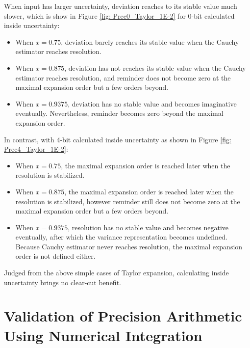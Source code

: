 \documentclass[twoside]{article}
\numberwithin{equation}{section}
\begin{document}
When input has larger uncertainty, deviation reaches to its stable value much slower, which is show in Figure \ref{fig: Prec0_Taylor_1E-2} for 0-bit calculated inside uncertainty: 
\begin{itemize} 
\item When $x=0.75$, deviation barely reaches its stable value when the Cauchy estimator reaches resolution.
\item When $x=0.875$, deviation has not reaches its stable value when the Cauchy estimator reaches resolution, and reminder does not become zero at the maximal expansion order but a few orders beyond.
\item When $x=0.9375$, deviation has no stable value and becomes imaginative eventually. Nevertheless, reminder becomes zero beyond the maximal expansion order.
\end{itemize}
In contrast, with 4-bit calculated inside uncertainty as shown in Figure \ref{fig: Prec4_Taylor_1E-2}:
\begin{itemize} 
\item When $x=0.75$, the maximal expansion order is reached later when the resolution is stabilized.
\item When $x=0.875$, the maximal expansion order is reached later when the resolution is stabilized, however reminder still does not become zero at the maximal expansion order but a few orders beyond.
\item When $x=0.9375$, resolution has no stable value and becomes negative eventually, after which the variance representation becomes undefined.  Because Cauchy estimator never reaches resolution, the maximal expansion order is not defined either.
\end{itemize}
Judged from the above simple cases of Taylor expansion, calculating inside uncertainty brings no clear-cut benefit.


\clearpage
\section{Validation of Precision Arithmetic Using Numerical Integration}
\label{sec: integration}
\end{document}
